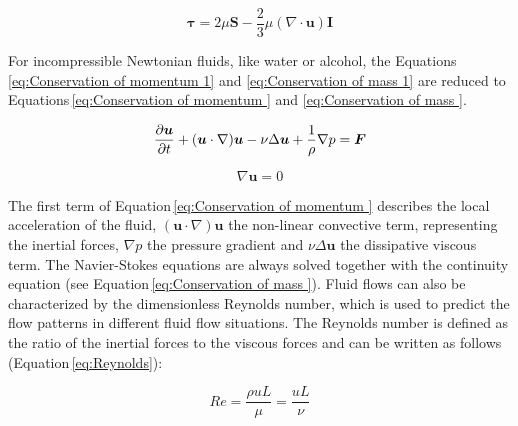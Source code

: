 \begin{equation}
\boldsymbol\tau = 2\mu\boldsymbol S - \frac{2}{3}\mu(\nabla\cdotp\boldsymbol u)\boldsymbol I
\label{eq:stress_tensor}
\end{equation}

For incompressible Newtonian fluids, like water or alcohol, the Equations\,\ref{eq:Conservation of momentum 1} and \ref{eq:Conservation of mass 1} are reduced to Equations\,\ref{eq:Conservation of momentum } and \ref{eq:Conservation of mass }\cite{versteeg2007introduction}. 

\begin{equation}
{\partial{\boldsymbol u}\over{\partial t}} + ({\boldsymbol u} \cdot \nabla) {\boldsymbol u} - \nu\Delta{\boldsymbol u}+ \frac{1}{\rho}\nabla p = {\boldsymbol F}
\label{eq:Conservation of momentum }
\end{equation}

\begin{equation}
\nabla{\boldsymbol u} = 0
\label{eq:Conservation of mass }
\end{equation}
 
The first term of Equation\,\ref{eq:Conservation of momentum } describes the local acceleration of the fluid, $({\boldsymbol u} \cdot \nabla) {\boldsymbol u}$ the non-linear convective term, representing the inertial forces, $\nabla p$ the pressure gradient and $\nu\Delta{\boldsymbol u}$ the dissipative viscous term. The Navier-Stokes equations are always solved together with the continuity equation (see Equation\,\ref{eq:Conservation of mass }).\newline 
Fluid flows can also be characterized by the dimensionless Reynolds number, which is used to predict the flow patterns in different fluid flow situations. The Reynolds number is defined as the ratio of the inertial forces to the viscous forces and can be written as follows (Equation\,\ref{eq:Reynolds}):  

\begin{equation}
Re=\frac{\rho u L}{\mu}=\frac{uL}{\nu}
\label{eq:Reynolds}
\end{equation}

